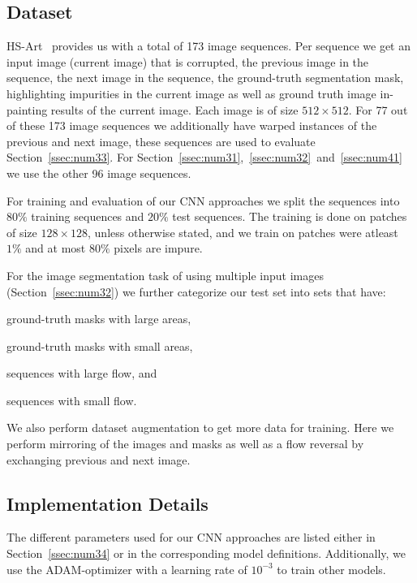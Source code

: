 \subsection{Dataset}
\label{ssec:num51}
HS-Art~\cite{hs-art} provides us with a total of 173 image sequences. Per sequence we get an input image (current image) that is corrupted, the previous image in the sequence, the next image in the sequence, the ground-truth segmentation mask, highlighting impurities in the current image as well as ground truth image in-painting results of the current image. Each image is of size $512 \times 512$. For 77 out of these 173 image sequences we additionally have warped instances of the previous and next image, these sequences are used to evaluate Section~\ref{ssec:num33}. For Section~\ref{ssec:num31},~\ref{ssec:num32}~and~\ref{ssec:num41} we use the other 96 image sequences.

For training and evaluation of our CNN approaches we split the sequences into $80\%$ training sequences and $20\%$ test sequences. The training is done on patches of size $128 \times 128$, unless otherwise stated, and we train on patches were atleast $1\%$ and at most $80\%$ pixels are impure.

For the image segmentation task of using multiple input images (Section~\ref{ssec:num32}) we further categorize our test set into sets that have: \begin{enumerate*}[label=(\roman*)] \item ground-truth masks with large areas, \item ground-truth masks with small areas, \item sequences with large flow, and \item sequences with small flow.\end{enumerate*}

We also perform dataset augmentation to get more data for training. Here we perform mirroring of the images and masks as well as a flow reversal by exchanging previous and next image.


\subsection{Implementation Details}
\label{ssec:num52}

The different parameters used for our CNN approaches are listed either in Section~\ref{ssec:num34} or in the corresponding model definitions. Additionally, we use the ADAM-optimizer with a learning rate of $10^{-3}$ to train other models.

